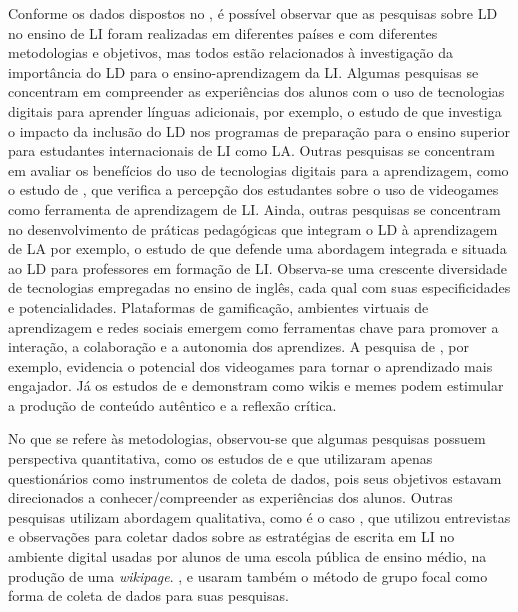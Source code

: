 Conforme os dados dispostos no , é possível observar que as
pesquisas sobre LD no ensino de LI foram realizadas em diferentes países
e com diferentes metodologias e objetivos, mas todos estão relacionados
à investigação da importância do LD para o ensino-aprendizagem da LI.
Algumas pesquisas se concentram em compreender as experiências dos
alunos com o uso de tecnologias digitais para aprender línguas
adicionais, por exemplo, o estudo de \textcite{roche2017assessing} que investiga o
impacto da inclusão do LD nos programas de preparação para o ensino
superior para estudantes internacionais de LI como LA. Outras pesquisas
se concentram em avaliar os benefícios do uso de tecnologias digitais
para a aprendizagem, como o estudo de \textcite{valadares2021videogames}, que
verifica a percepção dos estudantes sobre o uso de videogames como
ferramenta de aprendizagem de LI. Ainda, outras pesquisas se concentram
no desenvolvimento de práticas pedagógicas que integram o LD à
aprendizagem de LA por exemplo, o estudo de \textcite{campbell2020developing} que
defende uma abordagem integrada e situada ao LD para professores em
formação de LI. Observa-se uma crescente diversidade de tecnologias
empregadas no ensino de inglês, cada qual com suas especificidades e
potencialidades. Plataformas de gamificação, ambientes virtuais de
aprendizagem e redes sociais emergem como ferramentas chave para
promover a interação, a colaboração e a autonomia dos aprendizes. A
pesquisa de \textcite{valadares2021videogames}, por exemplo, evidencia o
potencial dos videogames para tornar o aprendizado mais engajador. Já os
estudos de \textcite{oliveira2018multiletramentos} e \textcite{xavier2019construcao}
demonstram como wikis e memes podem estimular a produção de conteúdo
autêntico e a reflexão crítica.

No que se refere às metodologias, observou-se que algumas pesquisas
possuem perspectiva quantitativa, como os estudos de \textcite{roche2017assessing} e
\textcite{bozavli2021foreign} que utilizaram apenas questionários como instrumentos de
coleta de dados, pois seus objetivos estavam direcionados a
conhecer/compreender as experiências dos alunos. Outras pesquisas
utilizam abordagem qualitativa, como é o caso \textcite{oliveira2018multiletramentos}, que utilizou entrevistas e observações para coletar dados sobre
as estratégias de escrita em LI no ambiente digital usadas por alunos de
uma escola pública de ensino médio, na produção de uma \emph{wikipage}.
\textcite{dhillon2021investigation}, \textcite{almusharraf2020postsecondary} e \textcite{campbell2020developing} usaram também o método de grupo focal como forma de coleta de
dados para suas pesquisas.

